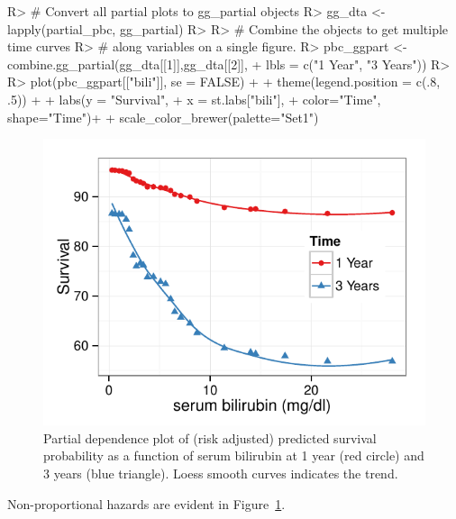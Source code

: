 \documentclass[nojss]{jss}\usepackage[]{graphicx}\usepackage[]{color}
\makeatletter
\def\maxwidth{ %
  \ifdim\Gin@nat@width>\linewidth
    \linewidth
  \else
    \Gin@nat@width
  \fi
}
\makeatother
\begin{document}
\begin{Schunk}
\begin{Sinput}
R> # Convert all partial plots to gg_partial objects
R> gg_dta <- lapply(partial_pbc, gg_partial)
R> 
R> # Combine the objects to get multiple time curves 
R> # along variables on a single figure.
R> pbc_ggpart <- combine.gg_partial(gg_dta[[1]],gg_dta[[2]], 
+                                  lbls = c("1 Year", "3 Years"))
R> 
R> plot(pbc_ggpart[["bili"]], se = FALSE) + 
+   theme(legend.position = c(.8, .5)) + 
+   labs(y = "Survival", 
+        x = st.labs["bili"],
+        color="Time", shape="Time")+
+   scale_color_brewer(palette="Set1")
\end{Sinput}
\begin{figure}[!htpb]

{\centering \includegraphics[width=\maxwidth]{figure/rfs-pbc-partial-bili-1} 

}

\caption[Partial dependence plot of (risk adjusted) predicted survival probability as a function of serum bilirubin at 1 year (red circle) and 3 years (blue triangle)]{Partial dependence plot of (risk adjusted) predicted survival probability as a function of serum bilirubin at 1 year (red circle) and 3 years (blue triangle). Loess smooth curves indicates the trend.\label{fig:pbc-partial-bili}}
\end{figure}
\end{Schunk}

Non-proportional hazards are evident in Figure~\ref{fig:pbc-partial-bili}.
\end{document}
